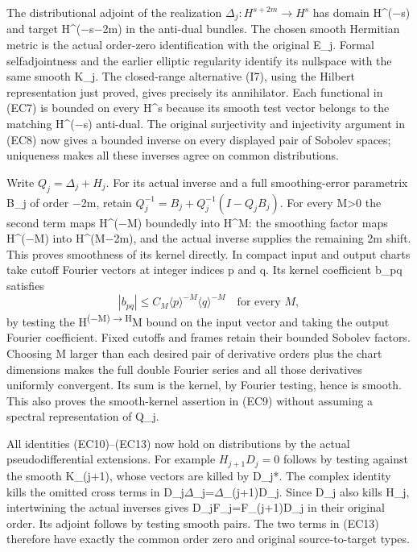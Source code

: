 \documentclass[
  11pt,
]{article}
\begin{document}
The distributional adjoint of the realization
\(\Delta_j:H^{s+2m}\to H^s\) has domain H\^{}(−s) and target
H\^{}(−s−2m) in the anti-dual bundles. The chosen smooth Hermitian
metric is the actual order-zero identification with the original E\_j.
Formal selfadjointness and the earlier elliptic regularity identify its
nullspace with the same smooth K\_j. The closed-range alternative (I7),
using the Hilbert representation just proved, gives precisely its
annihilator. Each functional in (EC7) is bounded on every H\^{}s because
its smooth test vector belongs to the matching H\^{}(−s) anti-dual. The
original surjectivity and injectivity argument in (EC8) now gives a
bounded inverse on every displayed pair of Sobolev spaces; uniqueness
makes all these inverses agree on common distributions.

Write \(Q_j=\Delta_j+H_j\). For its actual inverse and a full
smoothing-error parametrix B\_j of order −2m, retain
\(Q_j^{-1}=B_j+Q_j^{-1}(I-Q_jB_j)\). For every M\textgreater0 the second
term maps H\^{}(−M) boundedly into H\^{}M: the smoothing factor maps
H\^{}(−M) into H\^{}(M−2m), and the actual inverse supplies the
remaining 2m shift. This proves smoothness of its kernel directly. In
compact input and output charts take cutoff Fourier vectors at integer
indices p and q. Its kernel coefficient b\_pq satisfies \[
|b_{pq}|\leq C_M\langle p\rangle^{-M}\langle q\rangle^{-M}
\quad\text{for every }M,
\tag{LC3}
\] by testing the H\textsuperscript{(−M)\ensuremath{\to}H}M bound on the input vector
and taking the output Fourier coefficient. Fixed cutoffs and frames
retain their bounded Sobolev factors. Choosing M larger than each
desired pair of derivative orders plus the chart dimensions makes the
full double Fourier series and all those derivatives uniformly
convergent. Its sum is the kernel, by Fourier testing, hence is smooth.
This also proves the smooth-kernel assertion in (EC9) without assuming a
spectral representation of Q\_j.

All identities (EC10)--(EC13) now hold on distributions by the actual
pseudodifferential extensions. For example \(H_{j+1}D_j=0\) follows by
testing against the smooth K\_(j+1), whose vectors are killed by D\_j*.
The complex identity kills the omitted cross terms in
D\_j\ensuremath{\Delta}\_j=\ensuremath{\Delta}\_(j+1)D\_j. Since D\_j also kills H\_j, intertwining the
actual inverses gives D\_jF\_j=F\_(j+1)D\_j in their original order. Its
adjoint follows by testing smooth pairs. The two terms in (EC13)
therefore have exactly the common order zero and original
source-to-target types.
\end{document}
